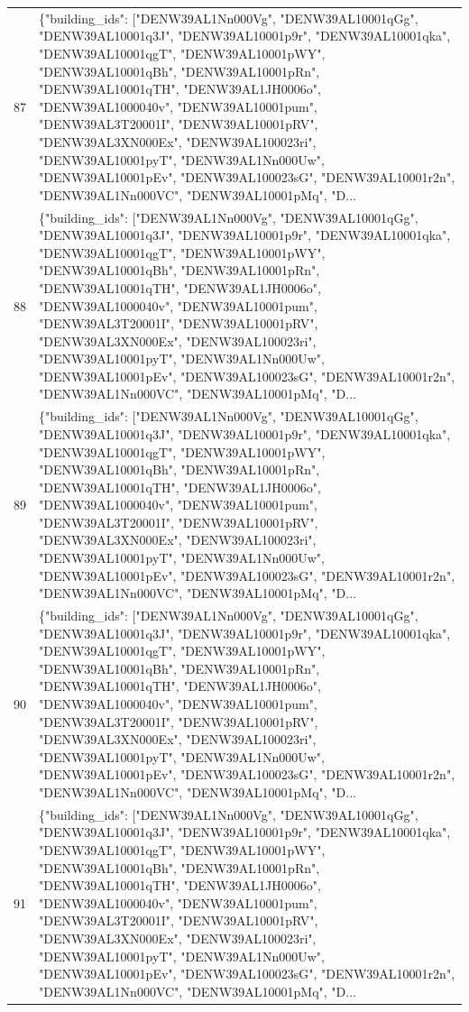 \documentclass[a4paper,11pt]{article}
\begin{document}
\begin{table}[ht]
\begin{tabular}{r p{12cm}}
87 & \{"building\_ids": ["DENW39AL1Nn000Vg", "DENW39AL10001qGg", "DENW39AL10001q3J", "DENW39AL10001p9r", "DENW39AL10001qka", "DENW39AL10001qgT", "DENW39AL10001pWY", "DENW39AL10001qBh", "DENW39AL10001pRn", "DENW39AL10001qTH", "DENW39AL1JH0006o", "DENW39AL1000040v", "DENW39AL10001pum", "DENW39AL3T20001I", "DENW39AL10001pRV", "DENW39AL3XN000Ex", "DENW39AL100023ri", "DENW39AL10001pyT", "DENW39AL1Nn000Uw", "DENW39AL10001pEv", "DENW39AL100023sG", "DENW39AL10001r2n", "DENW39AL1Nn000VC", "DENW39AL10001pMq", "D... \\
88 & \{"building\_ids": ["DENW39AL1Nn000Vg", "DENW39AL10001qGg", "DENW39AL10001q3J", "DENW39AL10001p9r", "DENW39AL10001qka", "DENW39AL10001qgT", "DENW39AL10001pWY", "DENW39AL10001qBh", "DENW39AL10001pRn", "DENW39AL10001qTH", "DENW39AL1JH0006o", "DENW39AL1000040v", "DENW39AL10001pum", "DENW39AL3T20001I", "DENW39AL10001pRV", "DENW39AL3XN000Ex", "DENW39AL100023ri", "DENW39AL10001pyT", "DENW39AL1Nn000Uw", "DENW39AL10001pEv", "DENW39AL100023sG", "DENW39AL10001r2n", "DENW39AL1Nn000VC", "DENW39AL10001pMq", "D... \\
89 & \{"building\_ids": ["DENW39AL1Nn000Vg", "DENW39AL10001qGg", "DENW39AL10001q3J", "DENW39AL10001p9r", "DENW39AL10001qka", "DENW39AL10001qgT", "DENW39AL10001pWY", "DENW39AL10001qBh", "DENW39AL10001pRn", "DENW39AL10001qTH", "DENW39AL1JH0006o", "DENW39AL1000040v", "DENW39AL10001pum", "DENW39AL3T20001I", "DENW39AL10001pRV", "DENW39AL3XN000Ex", "DENW39AL100023ri", "DENW39AL10001pyT", "DENW39AL1Nn000Uw", "DENW39AL10001pEv", "DENW39AL100023sG", "DENW39AL10001r2n", "DENW39AL1Nn000VC", "DENW39AL10001pMq", "D... \\
90 & \{"building\_ids": ["DENW39AL1Nn000Vg", "DENW39AL10001qGg", "DENW39AL10001q3J", "DENW39AL10001p9r", "DENW39AL10001qka", "DENW39AL10001qgT", "DENW39AL10001pWY", "DENW39AL10001qBh", "DENW39AL10001pRn", "DENW39AL10001qTH", "DENW39AL1JH0006o", "DENW39AL1000040v", "DENW39AL10001pum", "DENW39AL3T20001I", "DENW39AL10001pRV", "DENW39AL3XN000Ex", "DENW39AL100023ri", "DENW39AL10001pyT", "DENW39AL1Nn000Uw", "DENW39AL10001pEv", "DENW39AL100023sG", "DENW39AL10001r2n", "DENW39AL1Nn000VC", "DENW39AL10001pMq", "D... \\
91 & \{"building\_ids": ["DENW39AL1Nn000Vg", "DENW39AL10001qGg", "DENW39AL10001q3J", "DENW39AL10001p9r", "DENW39AL10001qka", "DENW39AL10001qgT", "DENW39AL10001pWY", "DENW39AL10001qBh", "DENW39AL10001pRn", "DENW39AL10001qTH", "DENW39AL1JH0006o", "DENW39AL1000040v", "DENW39AL10001pum", "DENW39AL3T20001I", "DENW39AL10001pRV", "DENW39AL3XN000Ex", "DENW39AL100023ri", "DENW39AL10001pyT", "DENW39AL1Nn000Uw", "DENW39AL10001pEv", "DENW39AL100023sG", "DENW39AL10001r2n", "DENW39AL1Nn000VC", "DENW39AL10001pMq", "D... \\

\end{tabular}
\end{table}
\end{document}
